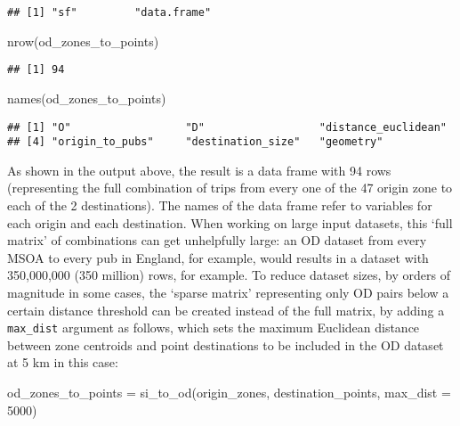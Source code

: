 \documentclass[11pt,letterpaper]{article}
\newenvironment{Shaded}{\begin{snugshade}}{\end{snugshade}}
\newcommand{\AttributeTok}[1]{\textcolor[rgb]{0.77,0.63,0.00}{#1}}
\newcommand{\DecValTok}[1]{\textcolor[rgb]{0.00,0.00,0.81}{#1}}
\newcommand{\FunctionTok}[1]{\textcolor[rgb]{0.00,0.00,0.00}{#1}}
\newcommand{\NormalTok}[1]{#1}
\newcommand{\OtherTok}[1]{\textcolor[rgb]{0.56,0.35,0.01}{#1}}
\begin{document}
\begin{verbatim}
## [1] "sf"         "data.frame"
\end{verbatim}

\begin{Shaded}
\begin{Highlighting}[]
\FunctionTok{nrow}\NormalTok{(od\_zones\_to\_points)}
\end{Highlighting}
\end{Shaded}

\begin{verbatim}
## [1] 94
\end{verbatim}

\begin{Shaded}
\begin{Highlighting}[]
\FunctionTok{names}\NormalTok{(od\_zones\_to\_points)}
\end{Highlighting}
\end{Shaded}

\begin{verbatim}
## [1] "O"                  "D"                  "distance_euclidean"
## [4] "origin_to_pubs"     "destination_size"   "geometry"
\end{verbatim}

As shown in the output above, the result is a data frame with 94 rows (representing the full combination of trips from every one of the 47 origin zone to each of the 2 destinations).
The names of the data frame refer to variables for each origin and each destination.
When working on large input datasets, this `full matrix' of combinations can get unhelpfully large: an OD dataset from every MSOA to every pub in England, for example, would results in a dataset with 350,000,000 (350 million) rows, for example.
To reduce dataset sizes, by orders of magnitude in some cases, the `sparse matrix' representing only OD pairs below a certain distance threshold can be created instead of the full matrix, by adding a \texttt{max\_dist} argument as follows, which sets the maximum Euclidean distance between zone centroids and point destinations to be included in the OD dataset at 5 km in this case:

\begin{Shaded}
\begin{Highlighting}[]
\NormalTok{od\_zones\_to\_points }\OtherTok{=} \FunctionTok{si\_to\_od}\NormalTok{(origin\_zones, destination\_points, }\AttributeTok{max\_dist =} \DecValTok{5000}\NormalTok{)}
\end{Highlighting}
\end{Shaded}
\end{document}
